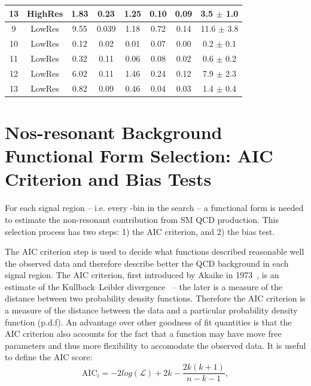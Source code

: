 \begin{table}[htb]
\begin{center}
\begin{tabular}{|c|c|c|c|c|c|c|c|}
13 & HighRes & 1.83  & 0.23   & 1.25   & 0.10   & 0.09    & 3.5 $\pm$ 1.0    \\    
\hline                                                                     
9  & LowRes & 9.55   & 0.039  & 1.18   & 0.72   & 0.14    & 11.6 $\pm$ 3.8   \\
10 & LowRes & 0.12   & 0.02   & 0.01   & 0.07   & 0.00    & 0.2 $\pm$ 0.1    \\
11 & LowRes & 0.32   & 0.11   & 0.06   & 0.08   & 0.02    & 0.6 $\pm$ 0.2    \\
12 & LowRes & 6.02   & 0.11   & 1.46   & 0.24   & 0.12    & 7.9 $\pm$ 2.3    \\
13 & LowRes & 0.82   & 0.09   & 0.46   & 0.04   & 0.03    & 1.4 $\pm$ 0.4    \\
\hline
\end{tabular}
\end{center}
\end{table}



\section{Nos-resonant Background Functional Form Selection: AIC
  Criterion and Bias Tests}
For each signal region -- i.e. every \MR-\Rtwo bin in the search -- a functional form is needed to estimate the non-resonant
contribution from SM QCD  production. This selection process has two
steps: 1) the AIC criterion, and 2) the bias test.

The AIC criterion step is used to decide what functions described
reasonable well the observed data and therefore describe better the
QCD background in each signal region. The AIC criterion, first
introduced by Akaike in 1973~\cite{AIC}, is an estimate of the
Kullback–Leibler divergence~\cite{KLbook} -- the later is a measure of
the distance between two probability density functions. Therefore the
AIC criterion is a measure of the distance between the data and a
particular probability density function (p.d.f). An advantage over
other goodness of fit quantities is that the AIC criterion also
accounts for the fact that a function may have move free parameters
and thus more flexibility to accomodate the observed data. It is
useful to define the AIC score:
\begin{equation}
\label{eq:AIC}
\mathrm{AIC}_{i} = -2log(\mathcal{L}) + 2k -\frac{2k(k+1)}{n-k-1},
\end{equation}


